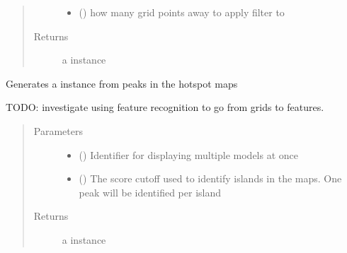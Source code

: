 \documentclass[letterpaper,10pt,english]{sphinxmanual}
\begin{document}
\begin{fulllineitems}
\begin{fulllineitems}
\begin{quote}
\begin{description}
\begin{itemize}
\item {} 
 () \textendash{} how many grid points away to apply filter to

\end{itemize}

\item[{Returns}] \leavevmode
a {\hyperref[\detokenize{result_api:hotspots.result.Results}]{}} instance

\end{description}\end{quote}

\end{fulllineitems}


\begin{fulllineitems}
\label{\detokenize{result_api:hotspots.result.Results.get_pharmacophore_model}}
Generates a  instance from peaks in the hotspot maps

TODO: investigate using feature recognition to go from grids to features.
\begin{quote}\begin{description}
\item[{Parameters}] \leavevmode\begin{itemize}
\item {} 
 () \textendash{} Identifier for displaying multiple models at once

\item {} 
 () \textendash{} The score cutoff used to identify islands in the maps. One peak will be identified per island

\end{itemize}

\item[{Returns}] \leavevmode
a  instance


\end{description}
\end{quote}
\end{fulllineitems}
\end{fulllineitems}
\end{document}
